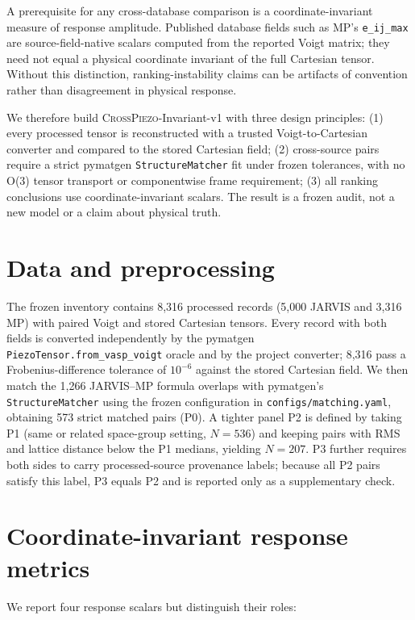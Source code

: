 \documentclass[11pt]{article}
\begin{document}
A prerequisite for any cross-database comparison is a coordinate-invariant measure of response amplitude. Published database fields such as MP's \texttt{e\_ij\_max} are source-field-native scalars computed from the reported Voigt matrix; they need not equal a physical coordinate invariant of the full Cartesian tensor. Without this distinction, ranking-instability claims can be artifacts of convention rather than disagreement in physical response.

We therefore build \textsc{CrossPiezo}-Invariant-v1 with three design principles: (1) every processed tensor is reconstructed with a trusted Voigt-to-Cartesian converter and compared to the stored Cartesian field; (2) cross-source pairs require a strict pymatgen \texttt{StructureMatcher} fit under frozen tolerances, with no O(3) tensor transport or componentwise frame requirement; (3) all ranking conclusions use coordinate-invariant scalars. The result is a frozen audit, not a new model or a claim about physical truth.

\section{Data and preprocessing}

The frozen inventory contains 8,316 processed records (5,000 JARVIS and 3,316 MP) with paired Voigt and stored Cartesian tensors. Every record with both fields is converted independently by the pymatgen \texttt{PiezoTensor.from\_vasp\_voigt} oracle and by the project converter; 8,316 pass a Frobenius-difference tolerance of $10^{-6}$ against the stored Cartesian field. We then match the 1,266 JARVIS--MP formula overlaps with pymatgen's \texttt{StructureMatcher} using the frozen configuration in \texttt{configs/matching.yaml}, obtaining 573 strict matched pairs (P0). A tighter panel P2 is defined by taking P1 (same or related space-group setting, $N=536$) and keeping pairs with RMS and lattice distance below the P1 medians, yielding $N=207$. P3 further requires both sides to carry processed-source provenance labels; because all P2 pairs satisfy this label, P3 equals P2 and is reported only as a supplementary check.

\section{Coordinate-invariant response metrics}

We report four response scalars but distinguish their roles:
\end{document}
